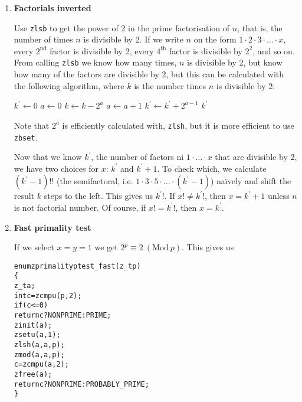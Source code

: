 \begin{enumerate}[label=\textbf{\arabic*}.]
\item \textbf{Factorials inverted}

Use \texttt{zlsb} to get the power of 2 in the
prime factorisation of $n$, that is, the number
of times $n$ is divisible by 2. If we write $n$ on
the form $1 \cdot 2 \cdot 3 \cdot \ldots \cdot x$,
every $2^\text{nd}$ factor is divisible by 2, every
$4^\text{th}$ factor is divisible by $2^2$, and so on.
From calling \texttt{zlsb} we know how many times,
$n$ is divisible by 2, but know how many of the factors
are divisible by 2, but this can be calculated with
the following algorithm, where $k$ is the number
times $n$ is divisible by 2:

\vspace{1em}
\hspace{-2.8ex}
\begin{minipage}{\linewidth}
\begin{algorithmic}
    \STATE $k^\prime \gets 0$
      \STATE $a \gets 0$
        \STATE $k \gets k - 2^a$
        \STATE $a \gets a + 1$
      \ENDWHILE
      \STATE $k^\prime \gets k^\prime + 2^{a - 1}$
    \ENDWHILE
    \RETURN $k^\prime$
\end{algorithmic}
\end{minipage}
\vspace{1em}

\noindent
Note that $2^a$ is efficiently calculated with,
\texttt{zlsh}, but it is more efficient to use
\texttt{zbset}.

Now that we know $k^\prime$, the number of
factors ni $1 \cdot \ldots \cdot x$ that are
divisible by 2, we have two choices for $x$:
$k^\prime$ and $k^\prime + 1$. To check which, we
calculate $(k^\prime - 1)!!$ (the semifactoral, i.e.
$1 \cdot 3 \cdot 5 \cdot \ldots \cdot (k^\prime - 1)$)
naïvely and shift the result $k$ steps to the left.
This gives us $k^\prime!$. If $x! \neq k^\prime!$, then
$x = k^\prime + 1$ unless $n$ is not factorial number.
Of course, if $x! = k^\prime!$, then $x = k^\prime$.



\item \textbf{Fast primality test}

If we select $x = y = 1$ we get
$2^p \equiv 2 ~(\text{Mod}~p)$. This gives us

\vspace{-1em}
\begin{alltt}
enum zprimality ptest_fast(z_t p)
\{
    z_t a;
    int c = zcmpu(p, 2);
    if (c <= 0)
        return c ? NONPRIME : PRIME;
    zinit(a);
    zsetu(a, 1);
    zlsh(a, a, p);
    zmod(a, a, p);
    c = zcmpu(a, 2);
    zfree(a);
    return c ? NONPRIME : PROBABLY_PRIME;
\}
\end{alltt}




\end{enumerate}
